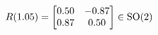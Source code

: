 \documentclass[preview]{standalone}
\begin{document}
\begin{align*}
\special{dvisvgm:raw <g id='unique000'>}R(1.05) = \begin{bmatrix} 0.50 & -0.87 \\ 0.87 & 0.50 \end{bmatrix} \in \text{SO}(2)\special{dvisvgm:raw </g>}
\end{align*}
\end{document}
